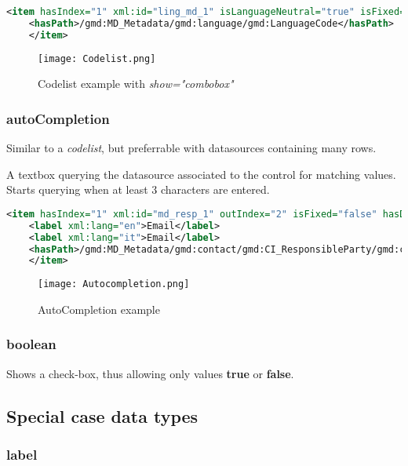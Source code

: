 \begin{lstlisting}[language=xml]
	<item hasIndex="1" xml:id="ling_md_1" isLanguageNeutral="true" isFixed="false" hasDatatype="codelist" datasource="languages" show="combobox">
	<hasPath>/gmd:MD_Metadata/gmd:language/gmd:LanguageCode</hasPath>
	</item>
\end{lstlisting}
\begin{figure}[h]
	\caption{Codelist example with \textit{show="combobox"}}
	\texttt{[image: Codelist.png]}
	\centering
\end{figure}

\subsubsection{autoCompletion}
\label{autoCompletion}

Similar to a \textit{codelist}, but preferrable with datasources containing many rows.

A textbox querying the datasource associated to the control for matching values.
Starts querying when at least 3 characters are entered.

\begin{lstlisting}[language=xml]
	<item hasIndex="1" xml:id="md_resp_1" outIndex="2" isFixed="false" hasDatatype="autoCompletion" datasource="person">
	<label xml:lang="en">Email</label>
	<label xml:lang="it">Email</label>
	<hasPath>/gmd:MD_Metadata/gmd:contact/gmd:CI_ResponsibleParty/gmd:contactInfo/gmd:CI_Contact/gmd:address/gmd:CI_Address/gmd:electronicMailAddress/gco:CharacterString</hasPath>
	</item>
\end{lstlisting}
\begin{figure}[h]
	\caption{AutoCompletion example}
	\texttt{[image: Autocompletion.png]}
	\centering
\end{figure}


\subsubsection{boolean}
\label{boolean}

Shows a check-box, thus allowing only values \textbf{true} or \textbf{false}.


\subsection{Special case data types}
\subsubsection{label}
\label{label}

